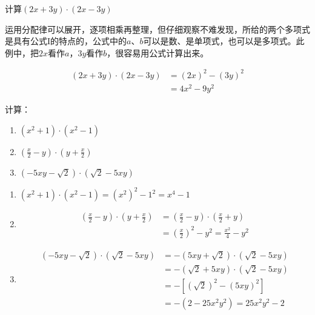 \begin{example}
    计算$(2x+3y)\cdot(2x-3y)$
\end{example}

\begin{analyze}
    运用分配律可以展开，逐项相乘再整理，但仔细观察不难发现，所给的两个多项式是具有公式I的特点的，公式中的$a$、$b$可以是数、是单项式，也可以是多项式。此例中，把$2x$看作$a$，$3y$看作$b$，很容易用公式计算出来。
\end{analyze}

\begin{solution}
    \[\begin{split}
        (2x+3y)\cdot(2x-3y)&=(2x)^2-(3y)^2\\
        &=4x^2-9y^2
    \end{split}\]
\end{solution}

\begin{example}
    计算：
\begin{enumerate}
    \item $(x^2+1)\cdot (x^2-1)$
    \item $\left(\frac{x}{2}-y\right)\cdot \left(y+\frac{x}{2}\right)$
    \item $\left(-5xy-\sqrt{2}\right)\cdot \left(\sqrt{2}-5xy\right)$
\end{enumerate}
\end{example}

\begin{solution}
\begin{enumerate}
    \item $(x^2+1)\cdot (x^2-1)=(x^2)^2-1^2=x^4-1$
    \item \[\begin{split}
        \left(\frac{x}{2}-y\right)\cdot \left(y+\frac{x}{2}\right)&=\left(\frac{x}{2}-y\right)\cdot \left(\frac{x}{2}+y\right)\\
        &=\left(\frac{x}{2}\right)^2-y^2=\frac{x^2}{4}-y^2 
    \end{split}\]
    \item \[\begin{split}
    \left(-5xy-\sqrt{2}\right)\cdot \left(\sqrt{2}-5xy\right)&=-\left(5xy+\sqrt{2}\right)\cdot \left(\sqrt{2}-5xy\right)\\
    &=-(\sqrt{2}+5xy)\cdot (\sqrt{2}-5xy)\\
    &=-\left[(\sqrt{2})^2-(5xy)^2\right]\\
    &=-(2-25x^2y^2)=25x^2y^2-2
    \end{split}\]
\end{enumerate}
\end{solution}

